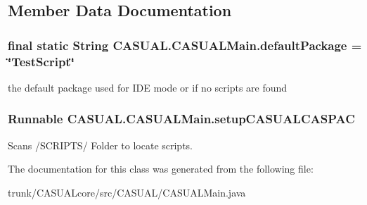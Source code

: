 \subsection{Member Data Documentation}
\hypertarget{class_c_a_s_u_a_l_1_1_c_a_s_u_a_l_main_a388333cdd95aadbbee46efc43efea098}{
\subsubsection[{default\-Package}]{\setlength{\rightskip}{0pt plus 5cm}final static String C\-A\-S\-U\-A\-L.\-C\-A\-S\-U\-A\-L\-Main.\-default\-Package = \char`\"{}Test\-Script\char`\"{}\hspace{0.3cm}{\ttfamily [static]}}}\label{class_c_a_s_u_a_l_1_1_c_a_s_u_a_l_main_a388333cdd95aadbbee46efc43efea098}
the default package used for I\-D\-E mode or if no scripts are found \hypertarget{class_c_a_s_u_a_l_1_1_c_a_s_u_a_l_main_ac0104001f09bb1d16dea21e6146abb76}{
\subsubsection[{setup\-C\-A\-S\-U\-A\-L\-C\-A\-S\-P\-A\-C}]{\setlength{\rightskip}{0pt plus 5cm}Runnable C\-A\-S\-U\-A\-L.\-C\-A\-S\-U\-A\-L\-Main.\-setup\-C\-A\-S\-U\-A\-L\-C\-A\-S\-P\-A\-C}}\label{class_c_a_s_u_a_l_1_1_c_a_s_u_a_l_main_ac0104001f09bb1d16dea21e6146abb76}
Scans /\-S\-C\-R\-I\-P\-T\-S/ Folder to locate scripts. 

The documentation for this class was generated from the following file\-:\begin{DoxyCompactItemize}
\item 
trunk/\-C\-A\-S\-U\-A\-Lcore/src/\-C\-A\-S\-U\-A\-L/C\-A\-S\-U\-A\-L\-Main.\-java\end{DoxyCompactItemize}
